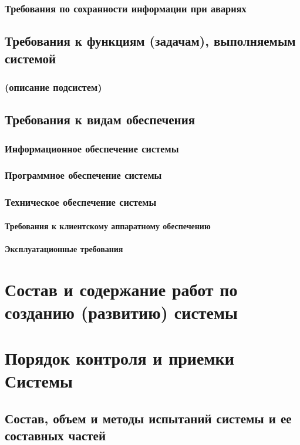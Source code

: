 \subsection{Требования по сохранности информации при авариях}
\section{Требования к функциям (задачам), выполняемым системой}
\subsection{(описание подсистем)}
\section{Требования к видам обеспечения}
\subsection{Информационное обеспечение системы}
\subsection{Программное обеспечение системы}
\subsection{Техническое обеспечение системы}
\subsubsection{Требования к клиентскому аппаратному обеспечению}
\subsubsection{Эксплуатационные требования}

\chapter{Состав и содержание работ по созданию (развитию) системы}

\chapter{Порядок контроля и приемки Системы}

\section{Состав, объем и методы испытаний системы и ее составных частей}
